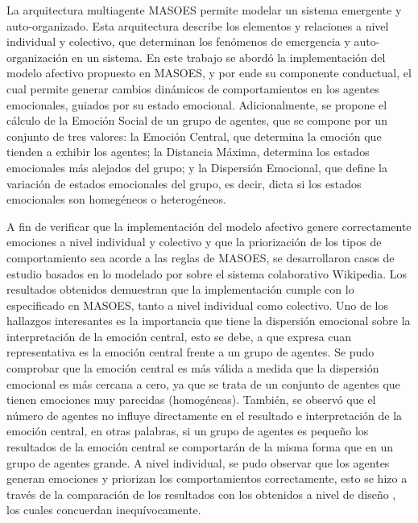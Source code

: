 %
%
%


La arquitectura multiagente MASOES permite modelar un sistema emergente
y auto-organizado. Esta arquitectura
describe los elementos y relaciones a nivel individual y colectivo, que
determinan los fenómenos de emergencia y auto-organización en un sistema.
En este trabajo se abordó la implementación del modelo afectivo
propuesto en MASOES, y por ende su componente conductual,
el cual permite generar cambios dinámicos de comportamientos en los
agentes emocionales, guiados por su estado emocional.
Adicionalmente, se propone el cálculo de
la Emoción Social de un grupo de agentes,
que se compone por un conjunto de tres valores: la Emoción Central,
que determina la emoción que tienden a exhibir los agentes;
la Distancia Máxima, determina los estados emocionales más alejados del grupo;
y la Dispersión Emocional, que define la variación de estados emocionales del grupo,
es decir, dicta si los estados emocionales son homegéneos o heterogéneos.

A fin de verificar que la implementación del modelo afectivo genere correctamente emociones a nivel individual y colectivo
y que la priorización de los tipos de comportamiento sea acorde a las reglas de MASOES,
se desarrollaron casos de estudio
basados en lo modelado por \cite{perozo2012} sobre el sistema colaborativo Wikipedia.
Los resultados obtenidos demuestran que la implementación cumple
con lo especificado en MASOES, tanto a nivel individual como colectivo.
Uno de los hallazgos interesantes es la importancia que tiene la dispersión emocional
sobre la interpretación de la emoción central, esto se debe, a que
expresa cuan representativa es la emoción central frente a un grupo de agentes.
Se pudo comprobar que la emoción central es más válida a medida que la dispersión
emocional es más cercana a cero, ya que se trata de un conjunto de agentes que tienen emociones muy parecidas (homogéneas).
También, se observó que el número de agentes no influye directamente en el resultado
e interpretación de la emoción central, en otras palabras, si un grupo de agentes
es pequeño los resultados de la emoción central se comportarán de la misma forma que en
un grupo de agentes grande.
A nivel individual,
se pudo observar que los agentes generan emociones y priorizan los comportamientos
correctamente, esto se hizo a través de la comparación de los resultados
con los obtenidos a nivel de diseño \citep{perozo2012}, los cuales concuerdan inequívocamente.

